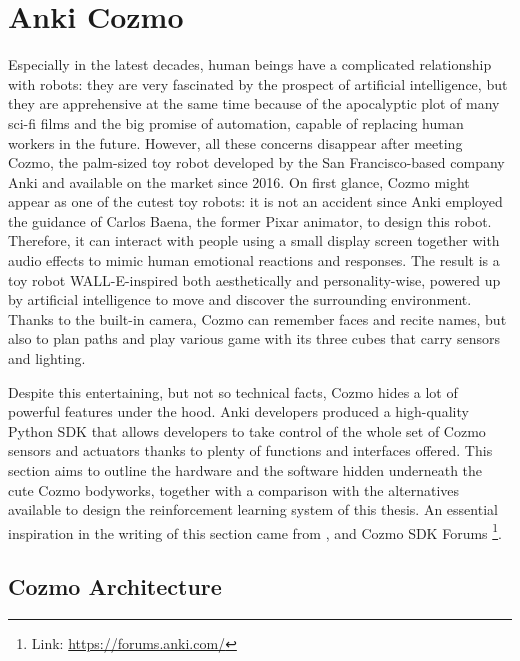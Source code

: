 \section{Anki Cozmo}

Especially in the latest decades, human beings have a complicated relationship with robots: they are very fascinated by the prospect of artificial intelligence, but they are apprehensive at the same time because of the apocalyptic plot of many sci-fi films and the big promise of automation, capable of replacing human workers in the future.
However, all these concerns disappear after meeting Cozmo, the palm-sized toy robot developed by the San Francisco-based company Anki and available on the market since 2016.
On first glance, Cozmo might appear as one of the cutest toy robots: it is not an accident since Anki employed the guidance of Carlos Baena, the former Pixar animator, to design this robot.
Therefore, it can interact with people using a small display screen together with audio effects to mimic human emotional reactions and responses.
The result is a toy robot WALL-E-inspired both aesthetically and personality-wise, powered up by artificial intelligence to move and discover the surrounding environment. Thanks to the built-in camera, Cozmo can remember faces and recite names, but also to plan paths and play various game with its three cubes that carry sensors and lighting.

Despite this entertaining, but not so technical facts, Cozmo hides a lot of powerful features under the hood. Anki developers produced a high-quality Python SDK that allows developers to take control of the whole set of Cozmo sensors and actuators thanks to plenty of functions and interfaces offered.
This section aims to outline the hardware and the software hidden underneath the cute Cozmo bodyworks, together with a comparison with the alternatives available to design the reinforcement learning system of this thesis. An essential inspiration in the writing of this section came from \cite{mellon2017cognitive}, \cite{touretzky2018cozmopedia} and Cozmo SDK Forums \footnote{Link: \href{https://forums.anki.com/}{https://forums.anki.com/}}.

\subsection{Cozmo Architecture}

